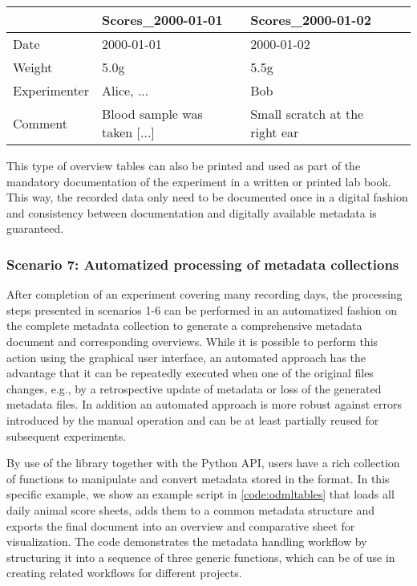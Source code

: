 \begin{center}
\begin{tabular}{llll}
\hline
				 & Scores\_2000-01-01 & Scores\_2000-01-02\\
\hline
Date             &  2000-01-01 & 2000-01-02\\
Weight           &  5.0g & 5.5g\\
Experimenter     & Alice, ... & Bob\\
Comment  & Blood sample was taken [...] & Small scratch at the right ear \\
\hline
\end{tabular}
\end{center}

This type of overview tables can also be printed and used as part of the mandatory documentation of the experiment in a written or printed lab book. This way, the recorded data only need to be documented once in a digital fashion and consistency between documentation and digitally available metadata is guaranteed. 

\subsubsection*{Scenario 7: Automatized processing of metadata collections}
After completion of an experiment covering many recording days, the processing steps presented in scenarios 1-6 can be performed in an automatized fashion on the complete metadata collection to generate a comprehensive metadata document and corresponding overviews. While it is possible to perform this action using the graphical user interface, an automated approach has the advantage that it can be repeatedly executed when one of the original files changes, e.g., by a retrospective update of metadata or loss of the generated metadata files. In addition an automated approach is more robust against errors introduced by the manual operation and can be at least partially reused for subsequent experiments.

By use of the  library together with the  Python API, users have a rich collection of functions to manipulate and convert metadata stored in the  format. In this specific example, we show an example script in \cref{code:odmltables} that loads all daily animal score sheets, adds them to a common metadata structure and exports the final document into an overview and comparative  sheet for visualization. The code demonstrates the metadata handling workflow by structuring it into a sequence of three generic functions, which can be of use in creating related workflows for different projects.


